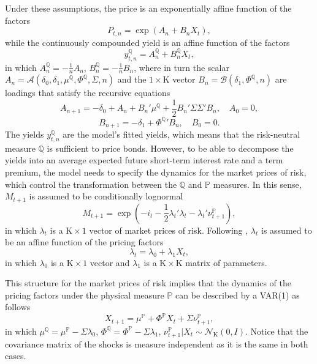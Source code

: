 \documentclass[a4paper, 12pt]{article}
\providecommand{\tnr}{n}
\providecommand{\idxt}{t}
\providecommand{\idxs}{\idxt,\tnr}
\providecommand{\yld}{y}
\providecommand{\yZero}{\yld_{\idxs}}
\providecommand{\yZeroQ}{\yZero^{\Qmeasure}}
\providecommand{\Pzero}{P_{\idxs}}
\providecommand{\srate}{i}
\providecommand{\shortrate}{\srate_{\idxt}}
\providecommand{\SDF}{M_{\idxt+1}}
\providecommand{\Xvars}{X_{\idxt}}
\providecommand{\XvarsFwd}{X_{\idxt+1}}
\providecommand{\affineA}{A_{\tnr}}
\providecommand{\affineB}{B_{\tnr}}
\providecommand{\affineAfwd}{A_{\tnr + 1}}
\providecommand{\affineBfwd}{B_{\tnr + 1}}
\providecommand{\affineAQ}{\affineA^{\Qmeasure}}
\providecommand{\affineBQ}{\affineB^{\Qmeasure}}
\providecommand{\Xdim}{\mathrm{K}}
\providecommand{\Normal}{\mathcal{N}}
\providecommand{\Pmeasure}{\mathbb{P}}
\providecommand{\Qmeasure}{\mathbb{Q}}
\providecommand{\riskprice}{\lambda_{t}}
\providecommand{\lambdazero}{\lambda_{0}}
\providecommand{\lambdaone}{\lambda_{1}}
\providecommand{\deltazero}{\delta_{0}}
\providecommand{\deltaone}{\delta_{1}}
\providecommand{\error}{\nu_{t+1}}
\providecommand{\errorP}{\error^{\Pmeasure}}
\providecommand{\XmuP}{\mu^{\Pmeasure}}
\providecommand{\XmuQ}{\mu^{\Qmeasure}}
\providecommand{\XSigma}{\Sigma}
\providecommand{\XPhiP}{\Phi^{\Pmeasure}}
\providecommand{\XPhiQ}{\Phi^{\Qmeasure}}
\newcommand{\eqyZeroQ}{\yZeroQ = \affineAQ + \affineBQ \Xvars}
\newcommand{\eqXvarsFwdP}{\XvarsFwd = \XmuP + \XPhiP \Xvars  + \XSigma \errorP}
\newcommand{\eqriskprice}{\riskprice = \lambdazero + \lambdaone \Xvars}
\newcommand{\eqSDF}{\SDF = \exp\left( -\shortrate -\frac{1}{2} \riskprice' \riskprice - \riskprice' \errorP \right)}
\begin{document}
Under these assumptions, the price is an exponentially affine function of the factors
\begin{equation*}
\Pzero = \exp\left( \affineA + \affineB \Xvars \right) ,
\end{equation*}
while the continuously compounded yield is an affine function of the factors
\begin{equation} \label{eq:nYaffineQ}
\eqyZeroQ ,
\end{equation}
in which \(\affineAQ = - \frac{1}{\tnr} \affineA\), \(\affineBQ = - \frac{1}{\tnr} \affineB\), where in turn the scalar \(\affineA = \mathcal{A}(\deltazero, \deltaone, \XmuQ, \XPhiQ, \XSigma, \tnr)\) and the \(1 \times \Xdim\) vector \(\affineB = \mathcal{B}(\deltaone, \XPhiQ, \tnr)\) are loadings that satisfy the recursive equations
\begin{equation} \label{eq:nAffineA}
\affineAfwd = - \deltazero + \affineA + \affineB' \XmuQ + \frac{1}{2} \affineB' \XSigma \XSigma' \affineB , \quad A_{0} = 0 ,
\end{equation}
\vspace{-.7cm}
\begin{equation} \label{eq:nAffineB}
\affineBfwd = - \deltaone + \XPhiQ{'} \affineB , \quad B_{0} = 0 .
\end{equation}
The yields \(\yZeroQ\) are the model's fitted yields, which means that the risk-neutral measure \(\Qmeasure\) is sufficient to price bonds. However, to be able to decompose the yields into an average expected future short-term interest rate and a term premium, the model needs to specify the dynamics for the market prices of risk, which control the transformation between the \(\Qmeasure\) and \(\Pmeasure\) measures. In this sense, \(\SDF\) is assumed to be conditionally lognormal
\begin{equation} \label{eq:nSDF}
\eqSDF ,
\end{equation}
in which \(\riskprice\) is a \(\Xdim \times 1\) vector of market prices of risk. Following \cite{Duffee:2002}, \(\riskprice\) is assumed to be an affine function of the pricing factors
\begin{equation} \label{eq:nRiskprice}
\eqriskprice ,
\end{equation}
in which \(\lambdazero\) is a \(\Xdim \times 1\) vector and \(\lambdaone\) is a \(\Xdim \times \Xdim\) matrix of parameters.

This structure for the market prices of risk implies that the dynamics of the pricing factors under the physical measure \(\Pmeasure\) can be described by a VAR(1) as follows
\begin{equation} \label{eq:nXvarsP}
\eqXvarsFwdP ,
\end{equation}
in which \(\XmuQ = \XmuP - \XSigma \lambdazero\), \(\XPhiQ = \XPhiP - \XSigma \lambdaone\),  \(\errorP | \Xvars \sim \Normal_{\Xdim} \left(0,I\right)\). Notice that the covariance matrix of the shocks is measure independent as it is the same in both cases. 
\end{document}
